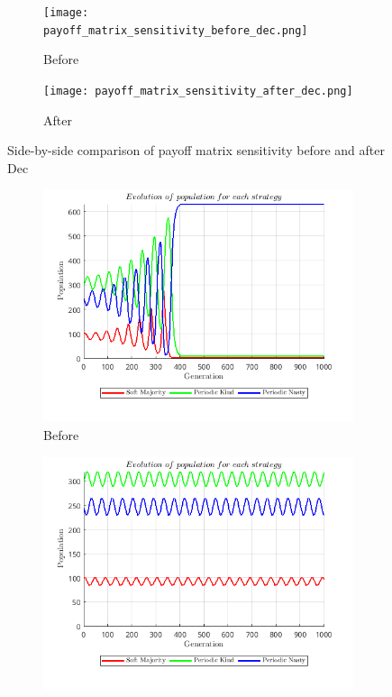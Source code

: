 \documentclass[12pt]{report}
\begin{document}
\begin{figure}[H]
    \centering
    \begin{subfigure}[t]{0.45\textwidth}
        \centering
        \texttt{[image: payoff\_matrix\_sensitivity\_before\_dec.png]}
        \caption{Before}
    \end{subfigure}
    \hfill
    \begin{subfigure}[t]{0.45\textwidth}
        \centering
        \texttt{[image: payoff\_matrix\_sensitivity\_after\_dec.png]}
        \caption{After}
    \end{subfigure}
    \caption{Side-by-side comparison of payoff matrix sensitivity before and after Dec}
\end{figure}

\begin{figure}[H]
    \centering
    \begin{subfigure}[t]{0.45\textwidth}
        \centering
        \includegraphics[width=\textwidth]{payoff_matrix_sensitivity_before_pop.png}
        \caption{Before}
    \end{subfigure}
    \hfill
    \begin{subfigure}[t]{0.45\textwidth}
        \centering
        \includegraphics[width=\textwidth]{payoff_matrix_sensitivity_after_pop.png}

\end{subfigure}
\end{figure}
\end{document}
